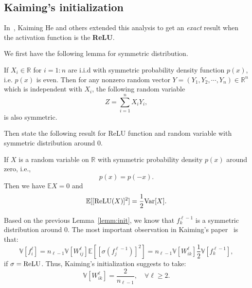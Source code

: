 %
%


\subsection{Kaiming's initialization}
In~\cite{he2015delving}, Kaiming He and others extended this analysis to get an \textit{exact} result when the activation function is the {\bf ReLU}.

We first have the following lemma for symmetric distribution.
\begin{lemma}
	If $X_i \in \mathbb{R}$ for $i=1:n$ are i.i.d with symmetric probability density function $p(x)$, i.e. $p(x)$ is even.
	Then for any nonzero random vector $Y = (Y_1, Y_2, \cdots, Y_n) \in \mathbb{R}^n$ which is independent with $X_i$, 
	the following random variable
	\begin{equation}\label{key}
	Z = \sum_{i=1}^n X_i Y_i,
	\end{equation} 
	is also symmetric.
\end{lemma}


Then state the following result for ReLU function and random variable with 
symmetric distribution around $0$.
\begin{lemma}
	If $X$ is a random variable on $\mathbb{R}$ with symmetric probability density $p(x)$ around zero, i.e., 
	\begin{equation}\label{key}
	p(x) = p(-x).
	\end{equation}
	Then we have $\mathbb{E} X = 0$ and 
	\begin{equation}\label{key}
	\mathbb{E}[[{\rm ReLU}(X)]^2] = \frac{1}{2}{\rm Var}[X].
	\end{equation}
\end{lemma}


Based on the previous Lemma~\ref{lemm:init}, we know that $f^{\ell-1}_k$ is a symmetric distribution around $0$.
The most important observation in Kaiming's paper~\cite{he2015delving} is that:
\begin{equation}\label{key}
\mathbb{V}[ f^\ell_i ] = n_{\ell-1}  \mathbb{V}[W^\ell_{ij}] {\mathbb{E}[[\sigma(f^{\ell-1}_j)]^2]} = n_{\ell-1} \mathbb{V}[W^\ell_{ik}] {\frac{1}{2} \mathbb{V}[f^{\ell-1}_k]},
\end{equation}
{if $\sigma = {\rm ReLU}$}.
Thus, Kaiming's initialization suggests to take:
\begin{equation}\label{key}
\mathbb{V}[W^\ell_{ik}] = \frac{2}{n_{\ell-1}}, \quad \forall \ell \ge 2.
\end{equation}


